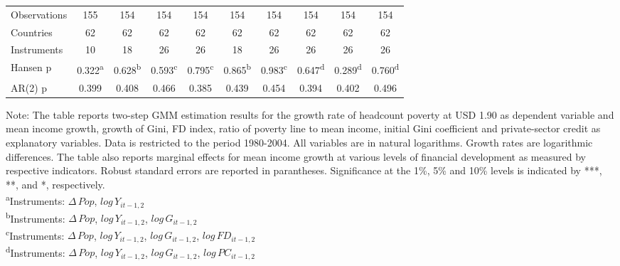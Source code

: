 \documentclass[12pt, a4paper]{article}
\begin{document}
\begin{table}
\begin{threeparttable}
{\begin{tabular}{l*{9}{c}}
				\hline
				Observations        &         155         &         154         &         154         &         154         &         154         &         154         &         154         &         154         &         154         \\
				Countries           &          62         &          62         &          62         &          62         &          62         &          62         &          62         &          62         &          62         \\
				Instruments         &          10         &          18         &          26         &          26         &          18         &          26         &          26         &          26         &          26         \\
				Hansen p         &       0.322\textsuperscript{a}         &       0.628\textsuperscript{b}         &       0.593\textsuperscript{c}         &       0.795\textsuperscript{c}         &       0.865\textsuperscript{b}         &       0.983\textsuperscript{c}         &       0.647\textsuperscript{d}         &       0.289\textsuperscript{d}         &       0.760\textsuperscript{d}         \\
				AR(2) p               &       0.399         &       0.408         &       0.466         &       0.385         &       0.439         &       0.454         &       0.394         &       0.402         &       0.496         \\
				\hline\hline
				
			\end{tabular}
		}
		\begin{tablenotes}
			\item \scriptsize{Note: The table reports two-step GMM estimation results for the growth rate of headcount poverty at USD 1.90 as dependent variable and mean income growth, growth of Gini, FD index, ratio of poverty line to mean income, initial Gini coefficient and private-sector credit as explanatory variables. Data is restricted to the period 1980-2004. All variables are in natural logarithms. Growth rates are logarithmic differences. The table also reports marginal effects for mean income growth at various levels of financial development as measured by respective indicators. Robust standard errors are reported in parantheses. Significance at the 1\%, 5\% and 10\% levels is indicated by ***, **, and *, respectively.\\
				\textsuperscript{a}Instruments: $\Delta \, Pop$, $log \, Y_{it-1,2}$}\\
			\textsuperscript{b}Instruments: $\Delta \, Pop$, $log \, Y_{it-1,2}$, $log \, G_{it-1,2}$\\
			\textsuperscript{c}Instruments: $\Delta \, Pop$, $log \, Y_{it-1,2}$, $log \, G_{it-1,2}$, $log \, FD_{it-1,2}$\\
			\textsuperscript{d}Instruments: $\Delta \, Pop$, $log \, Y_{it-1,2}$, $log \, G_{it-1,2}$, $log \, PC_{it-1,2}$\\
			

\end{tablenotes}
\end{threeparttable}
\end{table}
\end{document}
